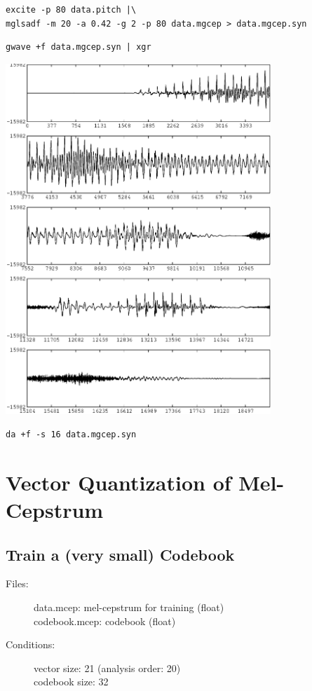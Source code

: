 \documentclass[a4paper,10pt]{article}
\begin{document}
\begin{verbatim}
excite -p 80 data.pitch |\
mglsadf -m 20 -a 0.42 -g 2 -p 80 data.mgcep > data.mgcep.syn
\end{verbatim}

\begin{verbatim}
gwave +f data.mgcep.syn | xgr
\end{verbatim}

\includegraphics[width=10cm]{eps/data.mgcep.syn.gwave.eps}

\begin{verbatim}
da +f -s 16 data.mgcep.syn
\end{verbatim}

\section{Vector Quantization of Mel-Cepstrum}

\subsection{Train a (very small) Codebook}
\begin{description}
\item[Files:]
   data.mcep: mel-cepstrum for training (float) \\
   codebook.mcep: codebook (float)
\item[Conditions:]
   vector size: 21 (analysis order: 20)\\
   codebook size: 32
\end{description}
\end{document}
